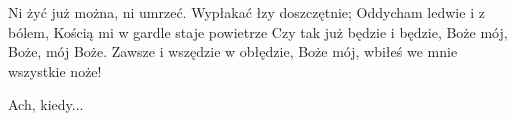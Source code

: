 \documentclass[../../../songbook.tex]{subfiles}
\begin{document}
Ni żyć już można, ni umrzeć. \newline
Wypłakać łzy doszczętnie; \newline
Oddycham ledwie i z bólem, \newline
Kością mi w gardle staje powietrze \newline
Czy tak już będzie i będzie, \newline
Boże mój, Boże, mój Boże. \newline
Zawsze i wszędzie w obłędzie, \newline
Boże mój, wbiłeś we mnie wszystkie noże! \newline

\-\hspace{1cm} Ach, kiedy...
\end{document}
